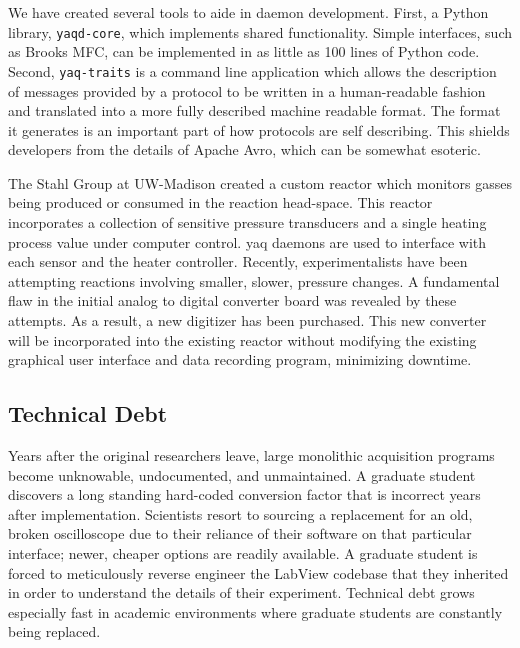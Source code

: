 We have created several tools to aide in daemon development.
First, a Python library, \texttt{yaqd-core}\cite{yaqd-core-python}, which implements shared functionality.
Simple interfaces, such as Brooks MFC\cite{yaqd-brooks-mfc}, can be implemented in as little as 100 lines of Python code.
Second, \texttt{yaq-traits}\cite{yaq-traits} is a command line application which allows the description of messages provided by a \yaq{} protocol to be written in a human-readable fashion and translated into a more fully described machine readable format.
The format it generates is an important part of how \yaq{} protocols are self describing.
This shields developers from the details of Apache Avro, which can be somewhat esoteric.

The Stahl Group at UW-Madison created a custom reactor which monitors gasses being produced or consumed in the reaction head-space.  \cite{SalazarChaseA2021a}
This reactor incorporates a collection of sensitive pressure transducers and a single heating process value under computer control.
yaq daemons are used to interface with each sensor and the heater controller.
Recently, experimentalists have been attempting reactions involving smaller, slower, pressure changes.
A fundamental flaw in the initial analog to digital converter board was revealed by these attempts.
As a result, a new digitizer has been purchased.
This new converter will be incorporated into the existing reactor without modifying the existing graphical user interface and data recording program, minimizing downtime.


\subsection{Technical Debt}

Years after the original researchers leave, large monolithic acquisition programs become unknowable, undocumented, and unmaintained.
A graduate student discovers a long standing hard-coded conversion factor that is incorrect years after implementation.
Scientists resort to sourcing a replacement for an old, broken oscilloscope due to their reliance of their software on that particular interface; newer, cheaper options are readily available.
A graduate student is forced to meticulously reverse engineer the LabView codebase that they inherited in order to understand the details of their experiment.
Technical debt grows especially fast in academic environments where graduate students are constantly being replaced.

